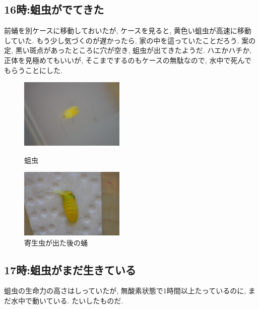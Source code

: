 \documentclass{jsarticle}
\begin{document}
\subsection{16時:蛆虫がでてきた}
前蛹を別ケースに移動しておいたが, ケースを見ると, 黄色い蛆虫が高速に移動していた. 
もう少し気づくのが遅かったら, 家の中を這っていたことだろう. 
案の定, 黒い斑点があったところに穴が空き, 蛆虫が出てきたようだ. 
ハエかハチか, 正体を見極めてもいいが, そこまでするのもケースの無駄なので, 水中で死んでもらうことにした. 
\begin{figure}[htbp]
  \begin{minipage}{0.5\hsize}
    \begin{center}
      \includegraphics[width=5cm]{photo4/maggot.JPG}
    \end{center}
    \caption{蛆虫}
  \end{minipage}
  \begin{minipage}{0.5\hsize}
    \begin{center}
      \includegraphics[width=5cm]{photo4/pupaDead.JPG}
    \end{center}
    \caption{寄生虫が出た後の蛹}
  \end{minipage}
\end{figure}

\subsection{17時:蛆虫がまだ生きている}
蛆虫の生命力の高さはしっていたが, 無酸素状態で1時間以上たっているのに, まだ水中で動いている. 
たいしたものだ. 
\end{document}
